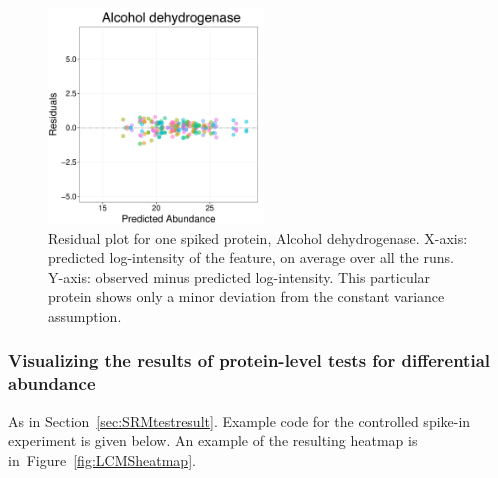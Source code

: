\documentclass[11pt]{article}
\def\figref#1{Figure~\ref{fig:#1}}
\def\secref#1{Section~\ref{sec:#1}}
\begin{document}
\begin{figure}[h!]
\begin{center}
\includegraphics[width=2.25in]{LCMS_unequal_ResidualPlot.pdf}
\vspace{-0.3cm}
\caption{\small Residual plot for one spiked protein, Alcohol dehydrogenase. X-axis: predicted log-intensity of the feature, on average over all the runs. Y-axis: observed minus predicted log-intensity. This particular protein shows only a minor deviation from the constant variance assumption.  \label{fig:LCMSresidualPlot}}
\end{center}
\end{figure}


\subsubsection{Visualizing the results of protein-level tests for differential abundance}

As in \secref{SRMtestresult}. Example code for the controlled spike-in experiment is given below. An example of the resulting heatmap is in~\figref{LCMSheatmap}.
\end{document}
